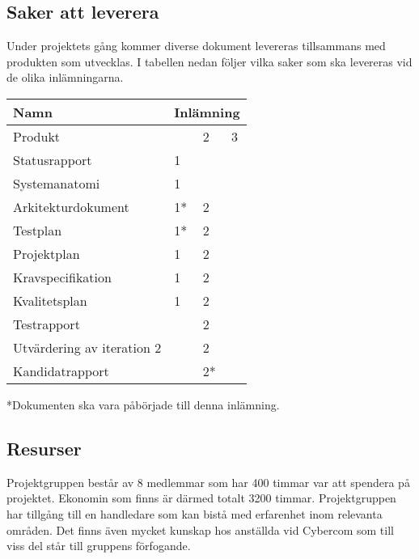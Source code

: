 \subsection{Saker att leverera}
Under projektets gång kommer diverse dokument levereras tillsammans med produkten som utvecklas. I tabellen nedan följer vilka saker som ska levereras vid de olika inlämningarna.

\begin{center}
    \begin{tabular}{| l | l l l |}
        \hline
        \textbf{Namn} & \multicolumn{3}{|c|}{ \textbf{Inlämning} } \\
        \hline
        \centering Produkt & & 2 & 3 \\
        \hline
        \centering Statusrapport & 1 & &\\
        \hline
        \centering Systemanatomi & 1 & &\\
        \hline
        \centering Arkitekturdokument & 1* & 2 &\\
        \hline
        \centering Testplan & 1* & 2 &\\
        \hline
        \centering Projektplan & 1 & 2 &\\
        \hline
        \centering Kravspecifikation & 1 & 2 &\\
        \hline
        \centering Kvalitetsplan & 1 & 2 &\\
        \hline
        \centering Testrapport & & 2 & \\
        \hline
        \centering Utvärdering av iteration 2 & & 2 &\\
        \hline
        \centering Kandidatrapport & & 2* &\\
        \hline
    \end{tabular}
\end{center}

*Dokumenten ska vara påbörjade till denna inlämning.

\subsection{Resurser}
Projektgruppen består av 8 medlemmar som har 400 timmar var att spendera på projektet. Ekonomin som finns är därmed totalt 3200 timmar. Projektgruppen har tillgång till en handledare som kan bistå med erfarenhet inom relevanta områden. Det finns även mycket kunskap hos anställda vid Cybercom som till viss del står till gruppens förfogande.\\

